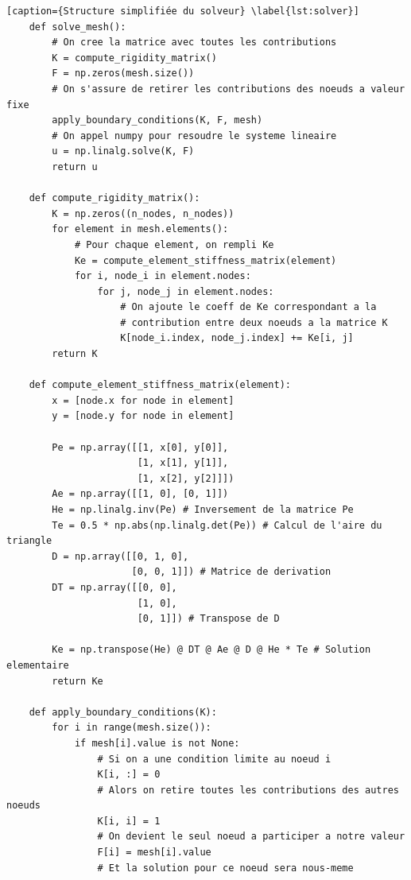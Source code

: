 \documentclass{article}
\begin{document}
\begin{lstlisting}[caption={Structure simplifiée du solveur} \label{lst:solver}]
    def solve_mesh():
        # On cree la matrice avec toutes les contributions
        K = compute_rigidity_matrix()
        F = np.zeros(mesh.size())
        # On s'assure de retirer les contributions des noeuds a valeur fixe
        apply_boundary_conditions(K, F, mesh)
        # On appel numpy pour resoudre le systeme lineaire
        u = np.linalg.solve(K, F)
        return u
    
    def compute_rigidity_matrix():
        K = np.zeros((n_nodes, n_nodes))
        for element in mesh.elements():
            # Pour chaque element, on rempli Ke
            Ke = compute_element_stiffness_matrix(element)
            for i, node_i in element.nodes:
                for j, node_j in element.nodes:
                    # On ajoute le coeff de Ke correspondant a la
                    # contribution entre deux noeuds a la matrice K
                    K[node_i.index, node_j.index] += Ke[i, j]
        return K
    
    def compute_element_stiffness_matrix(element):
        x = [node.x for node in element]
        y = [node.y for node in element]

        Pe = np.array([[1, x[0], y[0]],
                       [1, x[1], y[1]],
                       [1, x[2], y[2]]])
        Ae = np.array([[1, 0], [0, 1]])
        He = np.linalg.inv(Pe) # Inversement de la matrice Pe
        Te = 0.5 * np.abs(np.linalg.det(Pe)) # Calcul de l'aire du triangle
        D = np.array([[0, 1, 0],
                      [0, 0, 1]]) # Matrice de derivation
        DT = np.array([[0, 0],
                       [1, 0],
                       [0, 1]]) # Transpose de D

        Ke = np.transpose(He) @ DT @ Ae @ D @ He * Te # Solution elementaire
        return Ke

    def apply_boundary_conditions(K):
        for i in range(mesh.size()):
            if mesh[i].value is not None:
                # Si on a une condition limite au noeud i
                K[i, :] = 0
                # Alors on retire toutes les contributions des autres noeuds
                K[i, i] = 1
                # On devient le seul noeud a participer a notre valeur
                F[i] = mesh[i].value
                # Et la solution pour ce noeud sera nous-meme
    
    \end{lstlisting}
\end{document}
